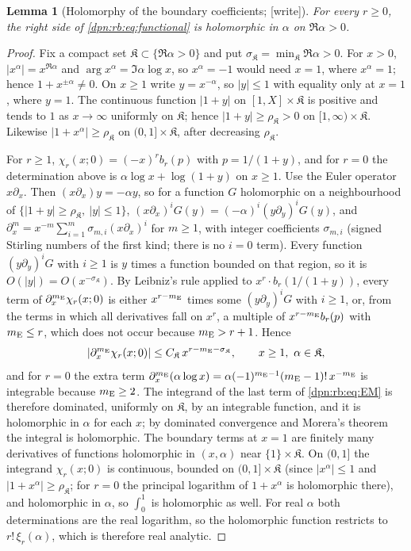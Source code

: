 \documentclass[11pt]{article}
\numberwithin{equation}{section}
\newtheorem{lemma}[theorem]{Lemma}
\theoremstyle{definition}\newtheorem{definition}[theorem]{Definition}
\theoremstyle{remark}\newtheorem{remark}[theorem]{Remark}
\newcommand{\wrt}{\textup{[write]}}
\begin{document}
\begin{lemma}[Holomorphy of the boundary coefficients; \wrt]\label{dpn:rb:lem:holo}
For every $r\ge0$, the right side of \eqref{dpn:rb:eq:functional} is
holomorphic in $\alpha$ on $\Re\alpha>0$.
\end{lemma}
\begin{proof}
Fix a compact set $\mathfrak K\subset\{\Re\alpha>0\}$ and put
$\sigma_{\mathfrak K}=\min_{\mathfrak K}\Re\alpha>0$.  For $x>0$, $|x^\alpha|=x^{\Re\alpha}$
and $\arg x^\alpha=\Im\alpha\log x$, so $x^\alpha=-1$ would need $x=1$, where
$x^\alpha=1$; hence $1+x^{\pm\alpha}\ne0$.  On $x\ge1$ write $y=x^{-\alpha}$,
so $|y|\le1$ with equality only at $x=1$, where $y=1$.  The continuous
function $|1+y|$ on $[1,X]\times\mathfrak K$ is positive and tends to $1$ as
$x\to\infty$ uniformly on $\mathfrak K$; hence $|1+y|\ge\rho_{\mathfrak K}>0$
on $[1,\infty)\times\mathfrak K$.  Likewise $|1+x^\alpha|\ge\rho_{\mathfrak K}$
on $(0,1]\times\mathfrak K$, after decreasing $\rho_{\mathfrak K}$.

For $r\ge1$, $\chi_r(x;0)=(-x)^rb_r(p)$ with $p=1/(1+y)$, and for $r=0$ the
determination above is $\alpha\log x+\log(1+y)$ on $x\ge1$.  Use the Euler
operator $x\partial_x$.  Then $(x\partial_x)y=-\alpha y$, so for a function
$G$ holomorphic on a neighbourhood of
$\{|1+y|\ge\rho_{\mathfrak K},\ |y|\le1\}$,
$(x\partial_x)^iG(y)=(-\alpha)^i(y\partial_y)^iG(y)$, and
$\partial_x^{m}=x^{-m}\sum_{i=1}^{m}\sigma_{m,i}(x\partial_x)^i$ for $m\ge1$,
with integer coefficients $\sigma_{m,i}$ (signed Stirling numbers of the first
kind; there is no $i=0$ term).  Every function $(y\partial_y)^iG$ with $i\ge1$
is $y$ times a function bounded on that region, so it is
$O(|y|)=O(x^{-\sigma_{\mathfrak K}})$.  By Leibniz's rule applied to
$x^r\cdot b_r(1/(1+y))$, every term of $\partial_x^{m_{\rm E}}\chi_r(x;0)$ is
either $x^{r-m_{\rm E}}$ times some $(y\partial_y)^iG$ with $i\ge1$, or, from
the terms in which all derivatives fall on $x^r$, a multiple of
$x^{r-m_{\rm E}}b_r(p)$ with $m_{\rm E}\le r$, which does not occur because
$m_{\rm E}>r+1$.  Hence
\[
 |\partial_x^{m_{\rm E}}\chi_r(x;0)|\le C_{\mathfrak K}\,x^{r-m_{\rm E}-\sigma_{\mathfrak K}},
 \qquad x\ge1,\ \alpha\in\mathfrak K,
\]
and for $r=0$ the extra term $\partial_x^{m_{\rm E}}(\alpha\log x)
=\alpha(-1)^{m_{\rm E}-1}(m_{\rm E}-1)!\,x^{-m_{\rm E}}$ is integrable because
$m_{\rm E}\ge2$.  The integrand of the last term of \eqref{dpn:rb:eq:EM} is
therefore dominated, uniformly on $\mathfrak K$, by an integrable function,
and it is holomorphic in $\alpha$ for each $x$; by dominated convergence and
Morera's theorem the integral is holomorphic.  The boundary terms at $x=1$
are finitely many derivatives of functions holomorphic in $(x,\alpha)$ near
$\{1\}\times\mathfrak K$.  On $(0,1]$ the integrand $\chi_r(x;0)$ is
continuous, bounded on $(0,1]\times\mathfrak K$ (since $|x^\alpha|\le1$ and
$|1+x^\alpha|\ge\rho_{\mathfrak K}$; for $r=0$ the principal logarithm of $1+x^\alpha$ is
holomorphic there), and holomorphic in $\alpha$, so $\int_0^1$ is
holomorphic as well.  For real $\alpha$ both determinations are the real
logarithm, so the holomorphic function restricts to $r!\,\xi_r(\alpha)$, which
is therefore real analytic.
\end{proof}
\end{document}

